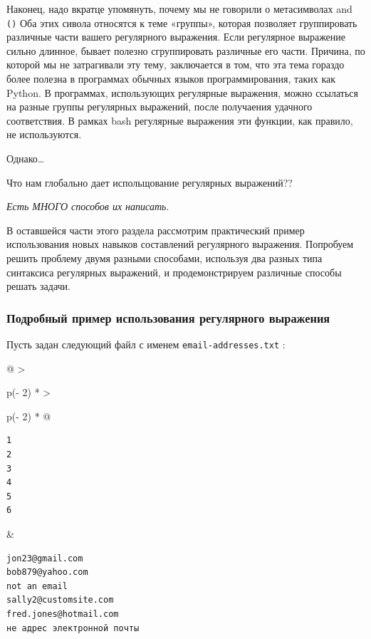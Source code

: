 \documentclass{report}
\begin{document}
Наконец, надо вкратце упомянуть, почему мы не говорили о метасимволах
\texttt{\textbar{}} and \texttt{()} Оба этих сивола относятся к теме
«группы», которая позволяет группировать различные части вашего
регулярного выражения. Если регулярное выражение сильно длинное, бывает
полезно сгруппировать различные его части. Причина, по которой мы не
затрагивали эту тему, заключается в том, что эта тема гораздо более
полезна в программах обычных языков программирования, таких как Python.
В программах, использующих регулярные выражения, можно ссылаться на
разные группы регулярных выражений, после получаения удачного
соответствия. В рамках bash регулярные выражения эти функции, как
правило, не используются.

Однако\ldots{}

Что нам глобально дает испольщование регулярных выражений??

\emph{Есть МНОГО способов их написать}.

В оставшейся части этого раздела рассмотрим практический пример
использования новых навыков составлений регулярного выражения. Попробуем
решить проблему двумя разными способами, используя два разных типа
синтаксиса регулярных выражений, и продемонстрируем различные способы
решать задачи.

\hypertarget{Detailed-Example-Regular-Expression}{%
\subsubsection{\texorpdfstring{\protect\hyperlink{Detailed-Example-Regular-Expression}{}Подробный
пример использования регулярного
выражения}{Подробный пример использования регулярного выражения}}\label{Detailed-Example-Regular-Expression}}

Пусть задан следующий файл с именем \texttt{email-addresses.txt} :

\begin{longtable}[]{@{}
  >{\raggedright\arraybackslash}p{(\columnwidth - 2\tabcolsep) * }
  >{\raggedright\arraybackslash}p{(\columnwidth - 2\tabcolsep) * }@{}}
\toprule
\endhead
\begin{minipage}[t]{\linewidth}\raggedright
\begin{verbatim}
1
2
3
4
5
6
\end{verbatim}
\end{minipage} & \begin{minipage}[t]{\linewidth}\raggedright
\begin{verbatim}
jon23@gmail.com
bob879@yahoo.com
not an email
sally2@customsite.com
fred.jones@hotmail.com
не адрес электронной почты
\end{verbatim}
\end{minipage} \\ \addlinespace
\bottomrule
\end{longtable}
\end{document}
